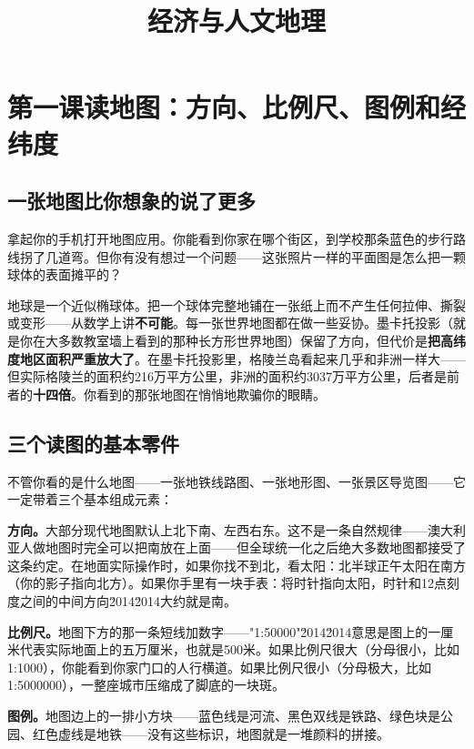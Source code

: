 \documentclass[a4paper,12pt]{ctexart}
\title{\textcolor{blue!70!black}{\Huge\textbf{经济与人文地理}}}
\author{}
\date{}
\begin{document}
\maketitle
\thispagestyle{empty}

\tableofcontents
\newpage

\section{\textcolor{orange!80!black}{第一课\quad 读地图：方向、比例尺、图例和经纬度}}

\subsection*{一张地图比你想象的说了更多}

拿起你的手机打开地图应用。你能看到你家在哪个街区，到学校那条蓝色的步行路线拐了几道弯。但你有没有想过一个问题——这张照片一样的平面图是怎么把一颗球体的表面摊平的？

地球是一个近似椭球体。把一个球体完整地铺在一张纸上而不产生任何拉伸、撕裂或变形——从数学上讲\textbf{不可能}。每一张世界地图都在做一些妥协。墨卡托投影（就是你在大多数教室墙上看到的那种长方形世界地图）保留了方向，但代价是\textbf{把高纬度地区面积严重放大了}。在墨卡托投影里，格陵兰岛看起来几乎和非洲一样大——但实际格陵兰的面积约216万平方公里，非洲的面积约3037万平方公里，后者是前者的\textbf{十四倍}。你看到的那张地图在悄悄地欺骗你的眼睛。

\subsection*{三个读图的基本零件}

不管你看的是什么地图——一张地铁线路图、一张地形图、一张景区导览图——它一定带着三个基本组成元素：

\textbf{方向。}大部分现代地图默认上北下南、左西右东。这不是一条自然规律——澳大利亚人做地图时完全可以把南放在上面——但全球统一化之后绝大多数地图都接受了这条约定。在地面实际操作时，如果你找不到北，看太阳：北半球正午太阳在南方（你的影子指向北方）。如果你手里有一块手表：将时针指向太阳，时针和12点刻度之间的中间方向\u2014\u2014大约就是南。

\textbf{比例尺。}地图下方的那一条短线加数字——"1:50000"\u2014\u2014\:意思是图上的一厘米代表实际地面上的五万厘米，也就是500米。如果比例尺很大（分母很小，比如1:1000），你能看到你家门口的人行横道。如果比例尺很小（分母极大，比如1:5000000），一整座城市压缩成了脚底的一块斑。

\textbf{图例。}地图边上的一排小方块——蓝色线是河流、黑色双线是铁路、绿色块是公园、红色虚线是地铁——没有这些标识，地图就是一堆颜料的拼接。
\end{document}
